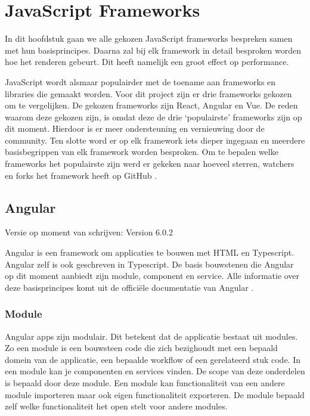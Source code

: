 \section{JavaScript Frameworks}
\label{sec:JavaScript_Frameworks}

In dit hoofdstuk gaan we alle gekozen JavaScript frameworks bespreken samen met hun basisprincipes. Daarna zal bij elk framework in detail besproken worden hoe het renderen gebeurt. Dit heeft namelijk een groot effect op performance.

JavaScript wordt alsmaar populairder met de toename aan frameworks en libraries die gemaakt worden. Voor dit project zijn er drie frameworks gekozen om te vergelijken. De gekozen frameworks zijn React, Angular en Vue. De reden waarom deze gekozen zijn, is omdat deze de drie ‘populairste’ frameworks zijn op dit moment. Hierdoor is er meer ondersteuning en vernieuwing door de community. Ten slotte word er op elk framework iets dieper ingegaan en meerdere basisbegrippen van elk framework worden besproken. Om te bepalen welke frameworks het populairste zijn werd er gekeken naar hoeveel sterren, watchers en forks het framework heeft op GitHub \autocite{github_front-end_????}.

\subsection{Angular}
\label{sec:JavaScript_Frameworks_Angular}
Versie op moment van schrijven: Version 6.0.2

Angular is een framework om applicaties te bouwen met HTML en Typescript. Angular zelf is ook geschreven in Typescript. De basis bouwstenen die Angular op dit moment aanbiedt zijn module, component en service.
Alle informatie over deze basisprincipes komt uit de officiële documentatie van Angular \autocite{_angular_2018}.

\subsubsection{Module}
\label{sec:Angular_Module}
Angular apps zijn modulair. Dit betekent dat de applicatie bestaat uit modules. Zo een module is een bouwsteen code die zich bezighoudt met een bepaald domein van de applicatie, een bepaalde workflow of een gerelateerd stuk code. In een module kan je componenten en services vinden. De scope van deze onderdelen is bepaald door deze module. Een module kan functionaliteit van een andere module importeren maar ook eigen functionaliteit exporteren. De module bepaald zelf welke functionaliteit het open stelt voor andere modules.

